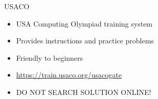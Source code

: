 \begin{frame}{USACO}
\begin{itemize}
    \item USA Computing Olympiad training system
    \item Provides instructions and practice problems
    \item Friendly to beginners
    \item \url {https://train.usaco.org/usacogate}
    \item \Large{DO NOT SEARCH SOLUTION ONLINE!}
\end{itemize}
\end{frame}

